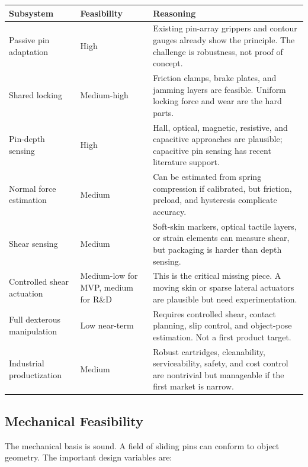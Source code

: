 \documentclass[11pt]{article}
\begin{document}
\begin{longtable}{L{0.24\textwidth} L{0.16\textwidth} L{0.48\textwidth}}
\toprule
\textbf{Subsystem} & \textbf{Feasibility} & \textbf{Reasoning} \\
\midrule
\endhead
Passive pin adaptation & High & Existing pin-array grippers and contour gauges already show the principle. The challenge is robustness, not proof of concept. \\
Shared locking & Medium-high & Friction clamps, brake plates, and jamming layers are feasible. Uniform locking force and wear are the hard parts. \\
Pin-depth sensing & High & Hall, optical, magnetic, resistive, and capacitive approaches are plausible; capacitive pin sensing has recent literature support. \\
Normal force estimation & Medium & Can be estimated from spring compression if calibrated, but friction, preload, and hysteresis complicate accuracy. \\
Shear sensing & Medium & Soft-skin markers, optical tactile layers, or strain elements can measure shear, but packaging is harder than depth sensing. \\
Controlled shear actuation & Medium-low for MVP, medium for R\&D & This is the critical missing piece. A moving skin or sparse lateral actuators are plausible but need experimentation. \\
Full dexterous manipulation & Low near-term & Requires controlled shear, contact planning, slip control, and object-pose estimation. Not a first product target. \\
Industrial productization & Medium & Robust cartridges, cleanability, serviceability, safety, and cost control are nontrivial but manageable if the first market is narrow. \\
\bottomrule
\end{longtable}

\subsection{Mechanical Feasibility}

The mechanical basis is sound. A field of sliding pins can conform to object geometry. The important design variables are:
\end{document}
